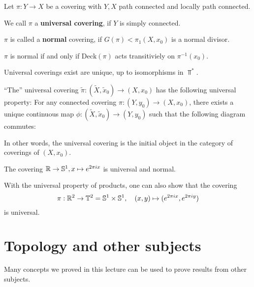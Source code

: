 \begin{dfn}[]
Let $\pi: Y \to  X$ be a covering with $Y,X$ path connected and locally path connected.

We call $\pi$ a \textbf{universal covering}, if $Y$ is simply connected.

$\pi$ is called a \textbf{normal} covering, if $G(\pi) < \pi_1(X,x_0)$ is a normal divisor.
\end{dfn}

\begin{rem}[]
  $\pi$ is normal if and only if $\text{Deck}(\pi)$ acts transitiviely on $\pi^{-1}(x_0)$.

  Universal coverings exist are unique, up to isomorphisms in $\Top^{\ast}$.

  ``The'' universal covering $\tilde{\pi}: (\tilde{X},\tilde{x}_0) \to (X,x_0)$ has the following universal property:
  For any connected covering $\pi:(Y,y_0) \to  (X,x_0)$, there exists a unique continuous map
  $\phi: (\tilde{X},\tilde{x}_0) \to  (Y,y_0)$ such that the following diagram commutes:

  \begin{center}
  \end{center}
  In other words, the universal covering is the initial object in the category of coverings of $(X,x_0)$.
\end{rem}



\begin{ex}[]
  The covering $\mathbb{R} \to \mathbb{S}^{1}, x \mapsto  e^{2 \pi i x}$ is universal and normal.

With the universal property of products, one can also show that the covering
\begin{align*}
  \pi: \mathbb{R}^{2} \to \mathbb{T}^{2} = \mathbb{S}^{1}\times \mathbb{S}^{1}, \quad (x,y) \mapsto (e^{2 \pi i x}, e^{2 \pi i y})
\end{align*}
is universal.
\end{ex}



\section{Topology and other subjects}
Many concepts we proved in this lecture can be used to prove results from other subjects.


